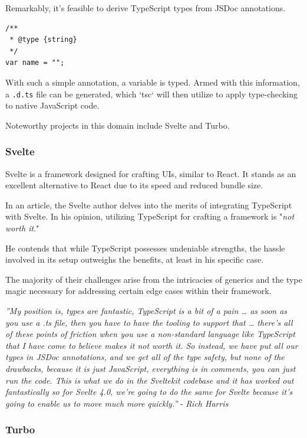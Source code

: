 \documentclass[10pt,journal,compsoc]{IEEEtran}
\begin{document}
Remarkably, it's feasible to derive TypeScript types from JSDoc annotations.

\begin{lstlisting}
/**
 * @type {string}
 */
var name = "";
\end{lstlisting}

With such a simple annotation, a variable is typed. Armed with this information, a \verb|.d.ts| file can be generated, which `tsc` will then utilize to apply type-checking to native JavaScript code.

Noteworthy projects in this domain include Svelte and Turbo.

\subsubsection{Svelte}

Svelte \cite{10101104} is a framework designed for crafting UIs, similar to React. It stands as an excellent alternative to React due to its speed and reduced bundle size.

In an article, the Svelte author delves into the merits of integrating TypeScript with Svelte. In his opinion, utilizing TypeScript for crafting a framework is "\textit{not worth it}."

He contends that while TypeScript possesses undeniable strengths, the hassle involved in its setup outweighs the benefits, at least in his specific case.

The majority of their challenges arise from the intricacies of generics and the type magic necessary for addressing certain edge cases within their framework.

\textit{''My position is, types are fantastic, TypeScript is a bit of a pain … as soon as you use a .ts file, then you have to have the tooling to support that … there's all of these points of friction when you use a non-standard language like TypeScript that I have come to believe makes it not worth it. So instead, we have put all our types in JSDoc annotations, and we get all of the type safety, but none of the drawbacks, because it is just JavaScript, everything is in comments, you can just run the code. This is what we do in the Sveltekit codebase and it has worked out fantastically so for Svelte 4.0, we're going to do the same for Svelte because it's going to enable us to move much more quickly.''} - \textit{Rich Harris} \cite{SvelteTS}

\subsubsection{Turbo}
\end{document}
